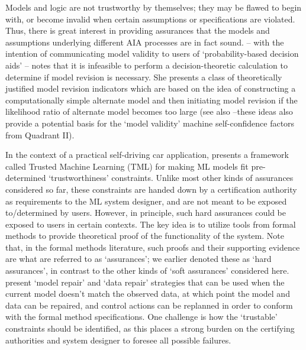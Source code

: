 Models and logic are not trustworthy by themselves; they may be flawed to begin with, or become invalid when certain assumptions or specifications are violated. Thus, there is great interest in providing assurances that the models and assumptions underlying different AIA processes are in fact sound. \citet{Laskey1991-mf} -- with the intention of communicating model validity to users of `probability-based decision aids' -- notes that it is infeasible to perform a decision-theoretic calculation to determine if model revision is necessary. 
She presents a class of theoretically justified model revision indicators which are based on the idea of constructing a computationally simple alternate model and then initiating model revision if the likelihood ratio of alternate model becomes too large (see also \citet{Zagorecki2015-qy,Habbema1976-xd} --these ideas also provide a potential basis for the `model validity' machine self-confidence factors from Quadrant II).

In the context of a practical self-driving car application, \citet{Ghosh2016-dl} presents a framework called Trusted Machine Learning (TML) for making ML models fit pre-determined `trustworthiness' constraints. 
Unlike most other kinds of assurances considered so far, these constraints are handed down by a certification authority as requirements to the ML system designer, and are not meant to be exposed to/determined by users. However, in principle, such hard assurances could be exposed to users in certain contexts. 
The key idea is to utilize tools from formal methods to provide theoretical proof of the functionality of the system. Note that, in the formal methods literature, such proofs and their supporting evidence are what are referred to as `assurances'; we earlier denoted these as `hard assurances', in contrast to the other kinds of `soft assurances' considered here.  \citet{Ghosh2016-dl}  present `model repair' and `data repair' strategies that can be used when the current model doesn't match the observed data, at which point the model and data can be repaired, and control actions can be replanned in order to conform with the formal method specifications. One challenge is how the `trustable' constraints should be identified, as this places a strong burden on the certifying authorities and system designer to foresee all possible failures. %

